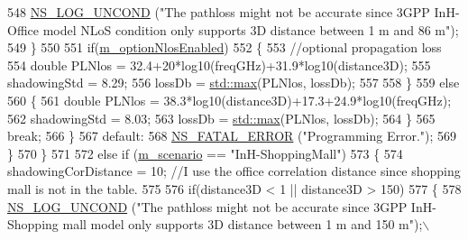 \begin{DoxyCode}
548                                         \hyperlink{log-macros-disabled_8h_a0b36e5e182b37194f85ef1c5e979fb2e}{NS\_LOG\_UNCOND} (\textcolor{stringliteral}{"The pathloss might not be accurate
       since 3GPP InH-Office model NLoS condition only supports 3D distance between 1 m and 86 m"});
549                                 \}
550 
551                                 \textcolor{keywordflow}{if}(\hyperlink{classMmWave3gppPropagationLossModel_a5029858358d3c4dac793ebf3c8c6cc09}{m\_optionNlosEnabled})
552                                 \{
553                                         \textcolor{comment}{//optional propagation loss}
554                                         \textcolor{keywordtype}{double} PLNlos = 32.4+20*log10(freqGHz)+31.9*log10(distance3D);
555                                         shadowingStd = 8.29;
556                                         lossDb = \hyperlink{80211b_8c_affe776513b24d84b39af8ab0930fef7f}{std::max}(PLNlos, lossDb);
557 
558                                 \}
559                                 \textcolor{keywordflow}{else}
560                                 \{
561                                         \textcolor{keywordtype}{double} PLNlos = 38.3*log10(distance3D)+17.3+24.9*log10(freqGHz);
562                                         shadowingStd = 8.03;
563                                         lossDb = \hyperlink{80211b_8c_affe776513b24d84b39af8ab0930fef7f}{std::max}(PLNlos, lossDb);
564                                 \}
565                                 \textcolor{keywordflow}{break};
566                         \}
567                         \textcolor{keywordflow}{default}:
568                                 \hyperlink{group__fatal_ga5131d5e3f75d7d4cbfd706ac456fdc85}{NS\_FATAL\_ERROR} (\textcolor{stringliteral}{"Programming Error."});
569                 \}
570         \}
571 
572         \textcolor{keywordflow}{else} \textcolor{keywordflow}{if} (\hyperlink{classMmWave3gppPropagationLossModel_a3ba2b9e45f4d02e49620faf03f97e898}{m\_scenario} == \textcolor{stringliteral}{"InH-ShoppingMall"})
573         \{
574                 shadowingCorDistance = 10; \textcolor{comment}{//I use the office correlation distance since shopping mall is
       not in the table.}
575 
576                 \textcolor{keywordflow}{if}(distance3D < 1 || distance3D > 150)
577                 \{
578                         \hyperlink{log-macros-disabled_8h_a0b36e5e182b37194f85ef1c5e979fb2e}{NS\_LOG\_UNCOND} (\textcolor{stringliteral}{"The pathloss might not be accurate since 3GPP
       InH-Shopping mall model only supports 3D distance between 1 m and 150 m"});\(\backslash\)

\end{DoxyCode}
